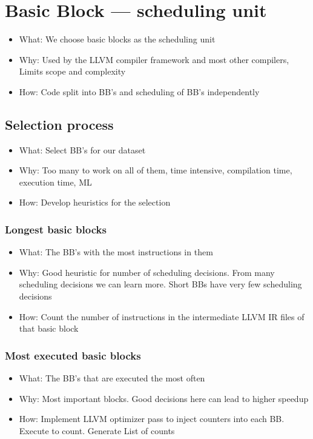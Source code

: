 \section{Basic Block --- scheduling unit}
\label{sec:approach:basicblock}
\begin{itemize}
    \item What: We choose basic blocks as the scheduling unit
    \item Why: Used by the LLVM compiler framework and most other compilers, Limits scope and complexity
    \item How: Code split into BB's and scheduling of BB's independently
\end{itemize}

\subsection{Selection process}
\begin{itemize}
    \item What: Select BB's for our dataset
    \item Why: Too many to work on all of them, time intensive, compilation time, execution time, ML
    \item How: Develop heuristics for the selection
\end{itemize}
\subsubsection{Longest basic blocks}
\begin{itemize}
    \item What: The BB's with the most instructions in them
    \item Why: Good heuristic for number of scheduling decisions. From many scheduling decisions we can learn more. Short BBs have very few scheduling decisions
    \item How: Count the number of instructions in the intermediate LLVM IR files of that basic block
\end{itemize}
\subsubsection{Most executed basic blocks}
\begin{itemize}
    \item What: The BB's that are executed the most often
    \item Why: Most important blocks. Good decisions here can lead to higher speedup
    \item How: Implement LLVM optimizer pass to inject counters into each BB. Execute to count. Generate List of counts
\end{itemize}
